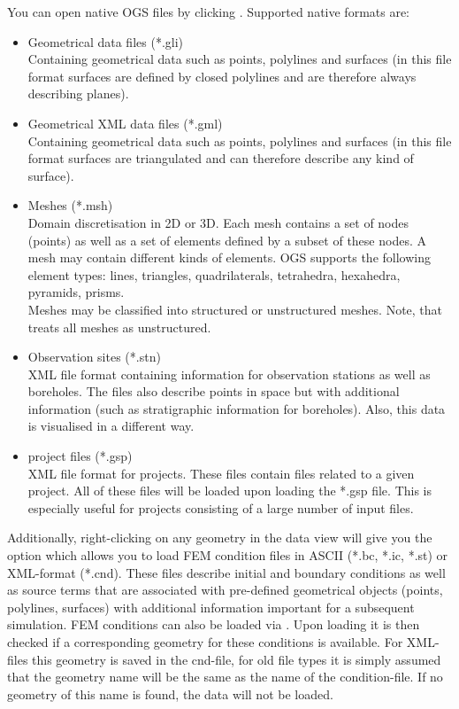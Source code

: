 You can open native OGS files by clicking . Supported native \ogs formats are:
\begin{itemize}
\item Geometrical data files (*.gli)\\
    Containing geometrical data such as points, polylines and surfaces (in this file format surfaces are defined by closed polylines and are therefore always describing planes).
\item Geometrical XML data files (*.gml)\\
    Containing geometrical data such as points, polylines and surfaces (in this file format surfaces are triangulated and can therefore describe any kind of surface).
\item Meshes (*.msh)\\
    Domain discretisation in 2D or 3D. Each mesh contains a set of nodes (points) as well as a set of elements defined by a subset of these nodes. A mesh may contain different kinds of elements. OGS supports the following element types: lines, triangles, quadrilaterals, tetrahedra, hexahedra, pyramids, prisms.\\
    Meshes may be classified into structured or unstructured meshes. Note, that \ogs treats all meshes as unstructured.
\item Observation sites (*.stn) \\
    XML file format containing information for observation stations as well as boreholes. The files also describe points in space but with additional information (such as stratigraphic information for boreholes). Also, this data is visualised in a different way.
\item \ogs project files (*.gsp)\\
    XML file format for \ogs projects. These files contain files related to a given project. All of these files will be loaded upon loading the *.gsp file. This is especially useful for projects consisting of a large number of input files.
\end{itemize}

Additionally, right-clicking on any geometry in the data view will give you the option  which allows you to load FEM condition files in ASCII (*.bc, *.ic, *.st) or XML-format (*.cnd). These files describe initial and boundary conditions as well as source terms that are associated with pre-defined geometrical objects (points, polylines, surfaces) with additional information important for a subsequent simulation. FEM conditions can also be loaded via . Upon loading it is then checked if a corresponding geometry for these conditions is available. For XML-files this geometry is saved in the cnd-file, for old file types it is simply assumed that the geometry name will be the same as the name of the condition-file. If no geometry of this name is found, the data will not be loaded.

